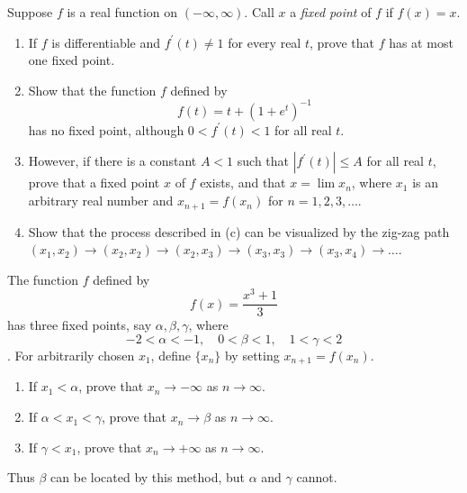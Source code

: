   \begin{exercise}[Rudin 5.22]
    Suppose $f$ is a real function on $(-\infty, \infty)$. Call $x$ a \textit{fixed point} of $f$ if $f(x) = x$.
    \begin{enumerate}
      \item[(a)] If $f$ is differentiable and $f^\prime(t) \ne 1$ for every real $t$, prove that $f$ has at most one fixed point.
      \item[(b)] Show that the function $f$ defined by
        \begin{equation}
          f(t) = t + (1 + e^t)^{-1}
        \end{equation}
        has no fixed point, although $0 < f^\prime(t) < 1$ for all real $t$.
      \item[(c)] However, if there is a constant $A < 1$ such that $|f^\prime(t)| \le A$ for all real $t$, prove that a fixed point $x$ of $f$ exists, and that $x = \lim x_n$, where $x_1$ is an arbitrary real number and $x_{n+1} = f(x_n)$ for $n = 1, 2, 3, \dots$.
      \item[(d)] Show that the process described in (c) can be visualized by the zig-zag path $(x_1, x_2) \to (x_2, x_2) \to (x_2, x_3) \to (x_3, x_3) \to (x_3, x_4) \to \dots$. 
    \end{enumerate}
  \end{exercise}
  \begin{solution}

  \end{solution}

  \begin{exercise}[Rudin 5.23]
    The function $f$ defined by
    \begin{equation}
      f(x) = \frac{x^3 + 1}{3}
    \end{equation}
    has three fixed points, say $\alpha, \beta, \gamma$, where
    \begin{equation}
      -2 < \alpha < -1, \quad 0 < \beta < 1, \quad 1 < \gamma < 2
    \end{equation}
   . For arbitrarily chosen $x_1$, define $\{x_n\}$ by setting $x_{n+1} = f(x_n)$.
    \begin{enumerate}
      \item[(a)] If $x_1 < \alpha$, prove that $x_n \to -\infty$ as $n \to \infty$.
      \item[(b)] If $\alpha < x_1 < \gamma$, prove that $x_n \to \beta$ as $n \to \infty$.
      \item[(c)] If $\gamma < x_1$, prove that $x_n \to +\infty$ as $n \to \infty$.
    \end{enumerate}
    Thus $\beta$ can be located by this method, but $\alpha$ and $\gamma$ cannot.
  \end{exercise}
  \begin{solution}

  \end{solution}

